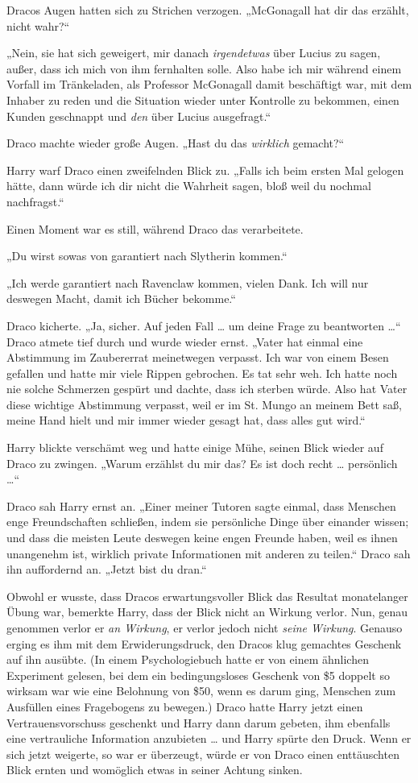{Dracos Augen hatten sich zu Strichen verzogen. „McGonagall hat dir das erzählt, nicht wahr?“

„Nein, sie hat sich geweigert, mir danach \emph{irgendetwas} über Lucius zu sagen, außer, dass ich mich von ihm fernhalten solle. Also habe ich mir während einem Vorfall im Tränkeladen, als Professor McGonagall damit beschäftigt war, mit dem Inhaber zu reden und die Situation wieder unter Kontrolle zu bekommen, einen Kunden geschnappt und \emph{den} über Lucius ausgefragt.“

Draco machte wieder große Augen. „Hast du das \emph{wirklich} gemacht?“

Harry warf Draco einen zweifelnden Blick zu. „Falls ich beim ersten Mal gelogen hätte, dann würde ich dir nicht die Wahrheit sagen, bloß weil du nochmal nachfragst.“

Einen Moment war es still, während Draco das verarbeitete.

„Du wirst sowas von garantiert nach Slytherin kommen.“

„Ich werde garantiert nach Ravenclaw kommen, vielen Dank. Ich will nur deswegen Macht, damit ich Bücher bekomme.“

Draco kicherte. „Ja, sicher. Auf jeden Fall … um deine Frage zu beantworten …“ Draco atmete tief durch und wurde wieder ernst. „Vater hat einmal eine Abstimmung im Zaubererrat meinetwegen verpasst. Ich war von einem Besen gefallen und hatte mir viele Rippen gebrochen. Es tat sehr weh. Ich hatte noch nie solche Schmerzen gespürt und dachte, dass ich sterben würde. Also hat Vater diese wichtige Abstimmung verpasst, weil er im St. Mungo an meinem Bett saß, meine Hand hielt und mir immer wieder gesagt hat, dass alles gut wird.“

Harry blickte verschämt weg und hatte einige Mühe, seinen Blick wieder auf Draco zu zwingen. „Warum erzählst du mir das? Es ist doch recht … persönlich …“

Draco sah Harry ernst an. „Einer meiner Tutoren sagte einmal, dass Menschen enge Freundschaften schließen, indem sie persönliche Dinge über einander wissen; und dass die meisten Leute deswegen keine engen Freunde haben, weil es ihnen unangenehm ist, wirklich private Informationen mit anderen zu teilen.“ Draco sah ihn auffordernd an. „Jetzt bist du dran.“

Obwohl er wusste, dass Dracos erwartungsvoller Blick das Resultat monatelanger Übung war, bemerkte Harry, dass der Blick nicht an Wirkung verlor. Nun, genau genommen verlor er \emph{an Wirkung}, er verlor jedoch nicht \emph{seine Wirkung}. Genauso erging es ihm mit dem Erwiderungsdruck, den Dracos klug gemachtes Geschenk auf ihn ausübte. (In einem Psychologiebuch hatte er von einem ähnlichen Experiment gelesen, bei dem ein bedingungsloses Geschenk von \$5 doppelt so wirksam war wie eine Belohnung von \$50, wenn es darum ging, Menschen zum Ausfüllen eines Fragebogens zu bewegen.) Draco hatte Harry jetzt einen Vertrauensvorschuss geschenkt und Harry dann darum gebeten, ihm ebenfalls eine vertrauliche Information anzubieten … und Harry spürte den Druck. Wenn er sich jetzt weigerte, so war er überzeugt, würde er von Draco einen enttäuschten Blick ernten und womöglich etwas in seiner Achtung sinken.

}
